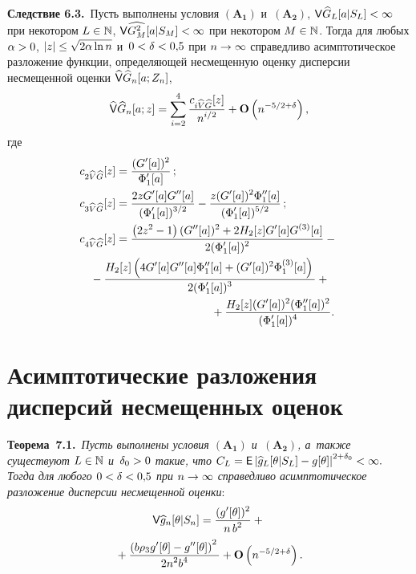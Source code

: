 \begin{multicols}{2}
\noindent
\textbf{Следствие 6.3.}\
Пусть выполнены условия $\mathbf{(A_1)}$ и~$\mathbf{(A_2)}$,
 $\Vp \widehat{G}_L[a|S_L]\hm<\infty$ при некотором $L\hm\in\mathbb{N}$,
 ${\sf V} \widehat{G^2_M}[a|S_M]\hm<\infty$ при некотором $M\hm\in\mathbb{N}$.
 Тогда для любых $\alpha\hm>0$, $|z|\hm\le \sqrt{2\alpha\ln n}$
 и~$0\hm<\delta\hm<0{,}5$ при $n\hm\to\infty$ справедливо асимптотическое разложение функции,
 определяющей несмещенную оценку дисперсии несмещенной оценки
 $\widehat{{\sf V}}\widehat{G}_n[a;Z_n]$,
 \begin{equation*}
 \widehat{{\sf V}}\widehat{G}_n[a;z]=
 \sum\limits_{i=2}^4 \displaystyle\frac{\displaystyle c_{i\widehat{V}\widehat{G}}[z]\mathstrut}{\displaystyle n^{i/2}\mathstrut}+\mathbf{O}\left( n^{-5/2+\delta}\right),
 \end{equation*}
 где
  \begin{align*}
 c_{2\widehat{V}\widehat{G}}[z]&=\fr{(G'[a])^2}{\Phi_1'[a]}\,;\\
 c_{3\widehat{V}\widehat{G}}[z]&=\fr{2 z G'[a] G''[a]}{(\Phi_1'[a])^{3/2}}-
 \fr{z (G'[a])^2 \Phi_1''[a]}{(\Phi_1'[a])^{5/2}}\,;
\\
 c_{4\widehat{V}\widehat{G}}[z]&=
 \fr{\left(2z^2-1\right) (G''[a])^2+2H_2[z] G'[a] G^{(3)}[a]}
      {2(\Phi_1'[a])^2}-{}
\\
&\hspace*{-8mm}{} -\fr{ H_2[z] \left(4G'[a] G''[a] \Phi_1''[a]+
 (G'[a])^2 \Phi_1^{(3)}[a]\right)}{2(\Phi_1'[a])^3}+{}\\
 &\hspace*{30mm}{}+
 \fr{H_2[z] (G'[a])^2 (\Phi_1''[a])^2}{(\Phi_1'[a])^4}.
 \end{align*}

\section{Асимптотические разложения дисперсий
  несмещенных оценок}

\noindent
\textbf{Теорема~7.1.}\
\textit{Пусть выполнены условия $\mathbf{(A_1)}$ и~$\mathbf{(A_2)}$, а~также
 существуют $L\hm\in\mathbb{N}$ и~$\delta_0\hm>0$ такие, что
 $C_L\hm=\Ep \left|\widehat{g}_L[\theta|S_L]\hm-g[\theta] \right|^{2+\delta_0}\hm<\infty.$
 Тогда для любого $0\hm<\delta\hm<0{,}5$ при $n\hm\rightarrow\infty$ 
 справедливо асимптотическое разложение дисперсии несмещенной оценки}:
 \begin{multline*}
 {\sf V} \widehat{g}_n[\theta|S_n]=
 \displaystyle\frac{\displaystyle (g'[\theta])^2\mathstrut}{\displaystyle n\,b^2\mathstrut} +{}\\
 {}+
 \displaystyle\frac{\displaystyle \left(b \rho_3 g'[\theta]-g''[\theta ]\right)^2\mathstrut}{\displaystyle 2 n^2 b^4\mathstrut}
 + \mathbf{O}\left( n^{-5/2+\delta}\right).
 \end{multline*}


\end{multicols}
